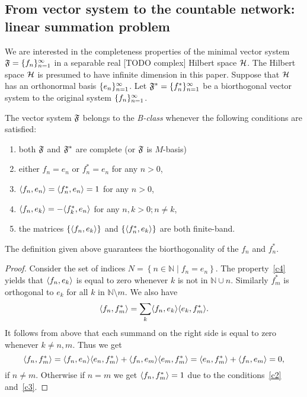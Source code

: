 \documentclass[12pt]{article}
\begin{document}
  \subsection{From vector system to the countable network: linear summation problem}
    \label{fsys2graphs}
    We are interested in the completeness properties of the minimal vector system $\fsys = \seq{f}$
      in a separable real [TODO complex] Hilbert space $\cal{H}$.
    The Hilbert space $\cal{H}$ is presumed to have infinite dimension in this paper.
    Suppose that $\cal{H}$ has an orthonormal basis $\seq{e}$.
    Let $\fstarsys = \{f_n^{*}\}_{n=1}^\infty$ be a biorthogonal vector system to the original system $\seq{f}$.
    \begin{definition}
      The vector system $\fsys$ belongs to the \emph{B-class} whenever the following conditions are satisfied:
      \begin{enumerate}[label=\textbf{C\arabic*}]
        \item \label{c1} both $\fsys$ and $\fstarsys$ are complete (or $\fsys$ is $M$-basis)
        \item either $f_n = e_n$ or $f^*_n = e_n$ for any $n > 0$,
        \item \label{c3} $\inner{f_n}{e_n} = \inner{f^*_n}{e_n} = 1$ for any $n > 0$,
        \item \label{c4} $\inner{f_n}{e_k} = -\inner{f^*_k}{e_n}$ for any $n, k > 0; n \neq k$,
        \item \label{c5} the matrices $\{\inner{f_n}{e_k}\}$ and $\{\inner{f^*_n}{e_k}\}$ are both finite-band.
      \end{enumerate}
    \end{definition}
    \begin{prop}
      The definition given above guarantees the biorthogonality of the $f_n$ and $f^*_n$.
    \end{prop}
    \begin{proof}
      Consider the set of indices $N = \left\{n \in \mathbb{N} \mid f_n = e_n \right\}$.
      The property~\ref{c4} yields that $\inner{f_n}{e_k}$ is equal to zero whenever $k$ is not in
        $\mathbb{N} \cup {n}$.
      Similarly $f^*_m$ is orthogonal to $e_k$ for all $k$ in $\mathbb{N} \setminus {m}$.
      We also have
      \[
        \inner{f_n}{f^*_m} = \sum_{k} \inner{f_n}{e_k} \inner{e_k}{f^*_m}.
      \]
      It follows from above that each summand on the right side is equal to zero whenever $k \neq n, m$.
      Thus we get
      \[
        \inner{f_n}{f^*_m} = \inner{f_n}{e_n} \inner{e_n}{f^*_m} + \inner{f_n}{e_m} \inner{e_m}{f^*_m}
        = \inner{e_n}{f^*_m} + \inner{f_n}{e_m} = 0,
      \]
      if $n \neq m$.
      Otherwise if $n = m$ we get $\inner{f_n}{f^*_m} = 1$ due to the conditions~\ref{c2} and~\ref{c3}.
    \end{proof}
\end{document}
